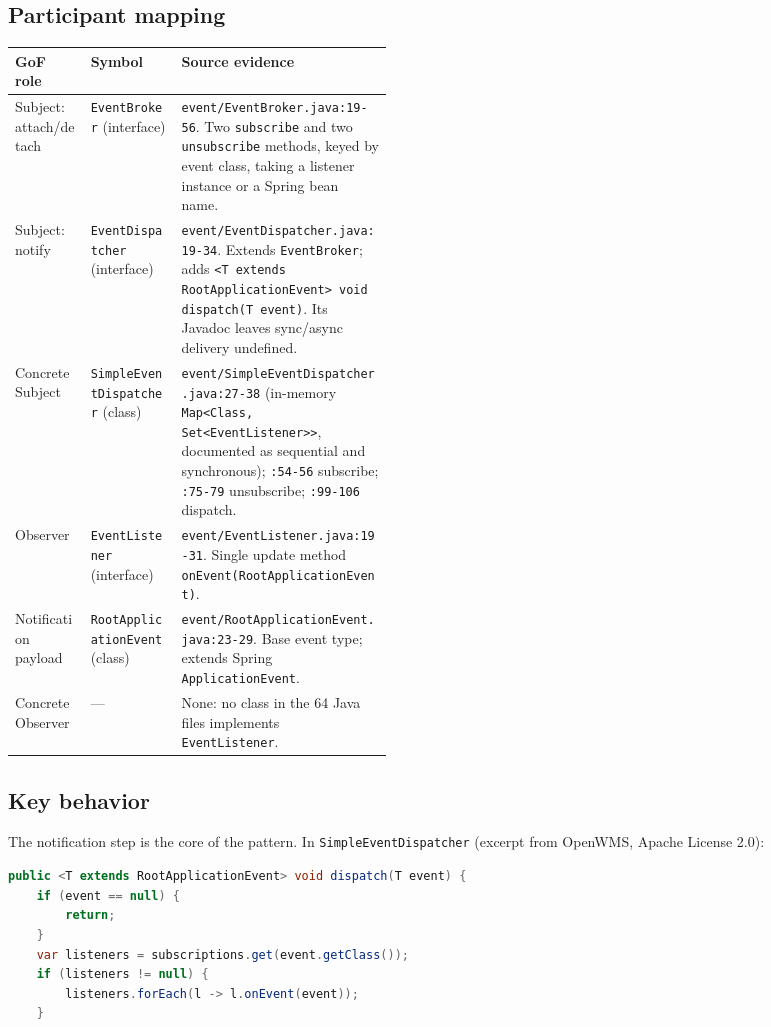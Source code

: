 \documentclass[11pt,a4paper]{article}
\newcommand{\code}[1]{\nolinkurl{#1}}
\begin{document}
\subsection{Participant mapping}
\noindent\begin{tabularx}{\linewidth}{@{}P{0.20\linewidth}P{0.24\linewidth}Y@{}}
\toprule
GoF role & Symbol & Source evidence\\
\midrule
Subject: attach/detach & \code{EventBroker} (interface) & \code{event/EventBroker.java:19-56}. Two \code{subscribe} and two \code{unsubscribe} methods, keyed by event class, taking a listener instance or a Spring bean name.\\
Subject: notify & \code{EventDispatcher} (interface) & \code{event/EventDispatcher.java:19-34}. Extends \code{EventBroker}; adds \code{<T extends RootApplicationEvent> void dispatch(T event)}. Its Javadoc leaves sync/async delivery undefined.\\
ConcreteSubject & \code{SimpleEventDispatcher} (class) & \code{event/SimpleEventDispatcher.java:27-38} (in-memory \code{Map<Class, Set<EventListener>>}, documented as sequential and synchronous); \code{:54-56} subscribe; \code{:75-79} unsubscribe; \code{:99-106} dispatch.\\
Observer & \code{EventListener} (interface) & \code{event/EventListener.java:19-31}. Single update method \code{onEvent(RootApplicationEvent)}.\\
Notification payload & \code{RootApplicationEvent} (class) & \code{event/RootApplicationEvent.java:23-29}. Base event type; extends Spring \code{ApplicationEvent}.\\
ConcreteObserver & --- & None: no class in the 64 Java files implements \code{EventListener}.\\
\bottomrule
\end{tabularx}

\subsection{Key behavior}
The notification step is the core of the pattern. In \code{SimpleEventDispatcher} (excerpt from OpenWMS, Apache License 2.0):

\begin{lstlisting}[language=Java,firstnumber=99]
public <T extends RootApplicationEvent> void dispatch(T event) {
    if (event == null) {
        return;
    }
    var listeners = subscriptions.get(event.getClass());
    if (listeners != null) {
        listeners.forEach(l -> l.onEvent(event));
    }
\end{lstlisting}
\end{document}

